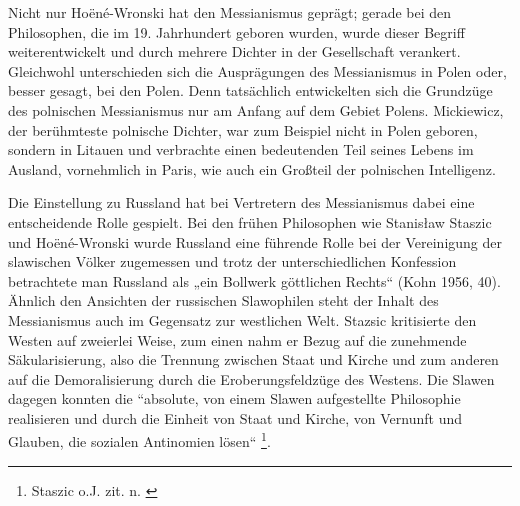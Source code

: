 \documentclass[12pt,headsepline,a4paper]{scrartcl}
\begin{document}
Nicht nur Hoëné-Wronski hat den Messianismus geprägt; gerade bei den Philosophen, die im
19. Jahrhundert geboren wurden, wurde dieser Begriff weiterentwickelt und durch mehrere
Dichter in der Gesellschaft verankert. Gleichwohl unterschieden sich die Ausprägungen des
Messianismus in Polen oder, besser gesagt, bei den Polen. Denn tatsächlich entwickelten sich
die Grundzüge des polnischen Messianismus nur am Anfang auf dem Gebiet Polens.
Mickiewicz, der berühmteste polnische Dichter, war zum Beispiel nicht in Polen geboren,
sondern in Litauen und verbrachte einen bedeutenden Teil seines Lebens im Ausland,
vornehmlich in Paris, wie auch ein Großteil der polnischen Intelligenz\autocite{braechter}.

Die Einstellung zu Russland hat bei Vertretern des Messianismus dabei eine entscheidende
Rolle gespielt. Bei den frühen Philosophen wie Stanisław Staszic und Hoëné-Wronski wurde
Russland eine führende Rolle bei der Vereinigung der slawischen Völker zugemessen und
trotz der unterschiedlichen Konfession betrachtete man Russland als „ein Bollwerk göttlichen
Rechts“ (Kohn 1956, 40). Ähnlich den Ansichten der russischen Slawophilen steht der Inhalt
des Messianismus auch im Gegensatz zur westlichen Welt. Stazsic kritisierte den Westen auf
zweierlei Weise, zum einen nahm er Bezug auf die zunehmende Säkularisierung, also die
Trennung zwischen Staat und Kirche und zum anderen auf die Demoralisierung
durch die Eroberungsfeldzüge des Westens\autocite[39]{kohn}. Die Slawen dagegen
konnten die “absolute, von einem Slawen aufgestellte Philosophie realisieren und durch die
Einheit von Staat und Kirche, von Vernunft und Glauben, die sozialen Antinomien lösen“
\footnote{Staszic o.J. zit. n. \autocite[40]{kohn}}.
\end{document}
